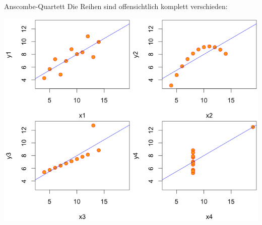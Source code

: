 \begin{example}{Anscombe-Quartett}
    Die Reihen sind offensichtlich komplett verschieden:

    \centering
    \includegraphics[width=.7\textwidth]{includes/figures/example_anscombe.png}
\end{example}
